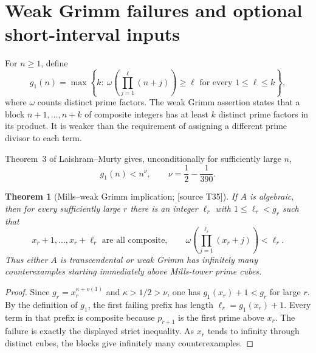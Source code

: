 \documentclass[11pt,a4paper]{article}
\newtheorem{theorem}{Theorem}[section]
\theoremstyle{definition}\newtheorem{definition}[theorem]{Definition}
\theoremstyle{remark}\newtheorem{remark}[theorem]{Remark}
\newcommand{\sourceT}[1]{\textup{[source T#1]}}
\begin{document}
\section{Weak Grimm failures and optional short-interval inputs}
For $n\ge1$, define
\[
 g_1(n)=\max\left\{k:\ 
 \omega\!\left(\prod_{j=1}^{\ell}(n+j)\right)\ge\ell
 \text{ for every }1\le\ell\le k\right\},
\]
where $\omega$ counts distinct prime factors. The weak Grimm assertion states that a block $n+1,\ldots,n+k$ of composite integers has at least $k$ distinct prime factors in its product. It is weaker than the requirement of assigning a different prime divisor to each term.

Theorem~3 of Laishram--Murty \cite{laishram-murty} gives, unconditionally for sufficiently large $n$,
\begin{equation}\label{eq:g1bound}
 g_1(n)<n^{\nu},\qquad \nu=\frac12-\frac1{390}.
\end{equation}
\begin{theorem}[Mills--weak Grimm implication; \sourceT{35}]\label{thm:grimm}
If $A$ is algebraic, then for every sufficiently large $r$ there is an integer $\ell_r$ with $1\le\ell_r<g_r$ such that
\[
 x_r+1,\ldots,x_r+\ell_r\text{ are all composite},\qquad
 \omega\!\left(\prod_{j=1}^{\ell_r}(x_r+j)\right)<\ell_r.
\]
Thus either $A$ is transcendental or weak Grimm has infinitely many counterexamples starting immediately above Mills-tower prime cubes.
\end{theorem}
\begin{proof}
Since $g_r=x_r^{\kappa+o(1)}$ and $\kappa>1/2>\nu$, one has $g_1(x_r)+1<g_r$ for large $r$. By the definition of $g_1$, the first failing prefix has length $\ell_r=g_1(x_r)+1$. Every term in that prefix is composite because $p_{r+1}$ is the first prime above $x_r$. The failure is exactly the displayed strict inequality. As $x_r$ tends to infinity through distinct cubes, the blocks give infinitely many counterexamples.
\end{proof}
\end{document}
